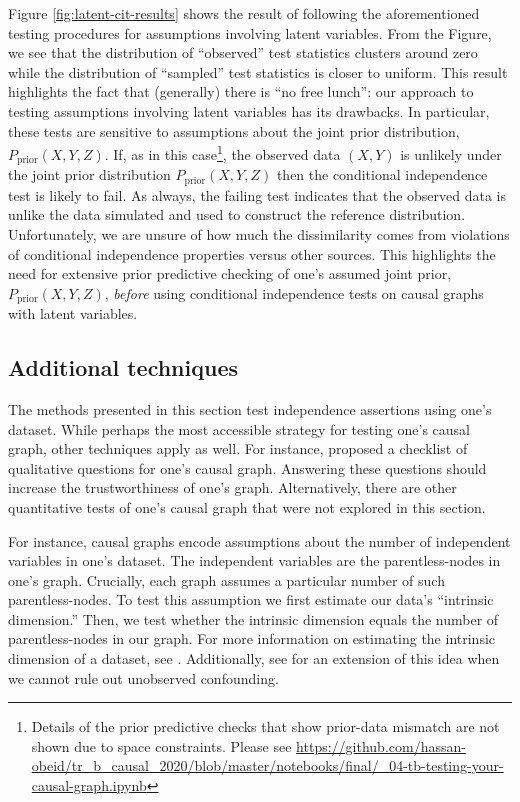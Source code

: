 Figure \ref{fig:latent-cit-results} shows the result of following the aforementioned testing procedures for assumptions involving latent variables.
From the Figure, we see that the distribution of ``observed'' test statistics clusters around zero while the distribution of ``sampled'' test statistics is closer to uniform.
This result highlights the fact that (generally) there is ``no free lunch'': our approach to testing assumptions involving latent variables has its drawbacks.
In particular, these tests are sensitive to assumptions about the joint prior distribution, $P_{\textrm{prior}} \left( X, Y, Z \right)$.
If, as in this case\footnote{Details of the prior predictive checks that show prior-data mismatch are not shown due to space constraints. Please see \url{https://github.com/hassan-obeid/tr_b_causal_2020/blob/master/notebooks/final/_04-tb-testing-your-causal-graph.ipynb}}, the observed data $\left( X, Y \right)$ is unlikely under the joint prior distribution $P_{\textrm{prior}} \left( X, Y, Z \right)$ then the conditional independence test is likely to fail.
As always, the failing test indicates that the observed data is unlike the data simulated and used to construct the reference distribution.
Unfortunately, we are unsure of how much the dissimilarity comes from violations of conditional independence properties versus other sources.
This highlights the need for extensive prior predictive checking of one's assumed joint prior, $P_{\textrm{prior}} \left( X, Y, Z \right)$, \textit{before} using conditional independence tests on causal graphs with latent variables.

\subsection{Additional techniques}
\label{sec:testing-addendum}

The methods presented in this section test independence assertions using one's dataset.
While perhaps the most accessible strategy for testing one's causal graph, other techniques apply as well.
For instance, \citet{pitchforth_2013_proposed} proposed a checklist of qualitative questions for one's causal graph.
Answering these questions should increase the trustworthiness of one's graph.
Alternatively, there are other quantitative tests of one's causal graph that were not explored in this section.

For instance, causal graphs encode assumptions about the number of independent variables in one's dataset.
The independent variables are the parentless-nodes in one's graph.
Crucially, each graph assumes a particular number of such parentless-nodes.
To test this assumption we first estimate our data's ``intrinsic dimension.''
Then, we test whether the intrinsic dimension equals the number of parentless-nodes in our graph.
For more information on estimating the intrinsic dimension of a dataset, see \citet{camastra_2016_intrinsic, song_2019_identification}.
Additionally, see \citet{chenwei_2019_likelihood} for an extension of this idea when we cannot rule out unobserved confounding.

